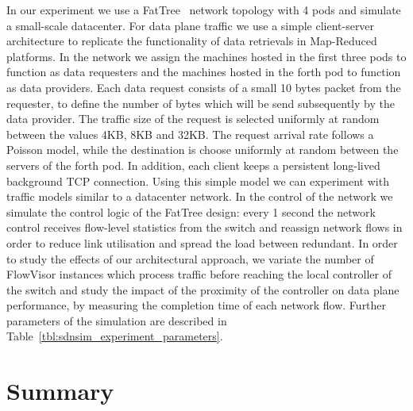 In our experiment we use a FatTree~\cite{Al-Fares08} network topology with 4
pods and simulate a small-scale datacenter. For data plane traffic we use a
simple client-server architecture to replicate the functionality of data
retrievals in Map-Reduced platforms. In the network we assign the machines
hosted in the first three pods to function as data requesters and the machines
hosted in the forth pod to function as data providers. Each data request
consists of a small 10 bytes packet from the requester, to define the number of
bytes which will be send subsequently by the data provider. The traffic size of
the request is selected uniformly at random between the values 4KB, 8KB and
32KB.  The request arrival rate follows a Poisson model, while the destination
is choose uniformly at random between the servers of the forth pod. In addition,
each client keeps a persistent long-lived background TCP connection. Using this
simple model we can experiment with traffic models similar to a datacenter
network. In the control of the network we simulate the control logic of the
FatTree design: every 1 second the network control receives flow-level
statistics from the switch and reassign network flows in order to reduce link
utilisation and spread the load between redundant. In order to study the effects
of our architectural approach, we variate the number of FlowVisor instances
which process \of traffic before reaching the local controller of the switch and
study the impact of the proximity of the controller on data plane performance,
by measuring the completion time of each network flow. Further parameters of the
simulation are described in Table~\ref{tbl:sdnsim_experiment_parameters}.


\section{Summary} \label{sec:modeling:summary}



